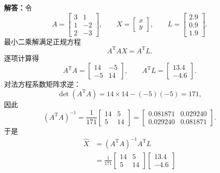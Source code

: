 \documentclass[UTF8,zihao=-4]{ctexart}
\newcommand{\jieda}{\noindent\textbf{解答：}}
\begin{document}
{\jieda 令
\begin{equation*}
    A=\begin{bmatrix}3&1\\1&-2\\2&-3\end{bmatrix},\qquad
    X=\begin{bmatrix}x\\y\end{bmatrix},\qquad
    L=\begin{bmatrix}2.9\\0.9\\1.9\end{bmatrix}.
\end{equation*}
最小二乘解满足正规方程
\begin{equation*}
    A^{\mathrm T}AX=A^{\mathrm T}L.
\end{equation*}
逐项计算得
\begin{equation*}
    A^{\mathrm T}A=
    \begin{bmatrix}
        14&-5\\-5&14
    \end{bmatrix},\qquad
    A^{\mathrm T}L=
    \begin{bmatrix}
        13.4\\-4.6
    \end{bmatrix}.
\end{equation*}
对法方程系数矩阵求逆：
\begin{equation*}
    \det(A^{\mathrm T}A)=14\times14-(-5)(-5)=171,
\end{equation*}
因此
\begin{equation*}
    (A^{\mathrm T}A)^{-1}=\frac{1}{171}
    \begin{bmatrix}
        14&5\\5&14
    \end{bmatrix}
    =\begin{bmatrix}
        0.081871&0.029240\\
        0.029240&0.081871
    \end{bmatrix}.
\end{equation*}
于是
\begin{equation*}
\begin{aligned}
    \hat{X}&=(A^{\mathrm T}A)^{-1}A^{\mathrm T}L                         \\
    &=\frac{1}{171}
    \begin{bmatrix}14&5\\5&14\end{bmatrix}
    \begin{bmatrix}13.4\\-4.6\end{bmatrix}

\end{aligned}
\end{equation*}}
\end{document}
